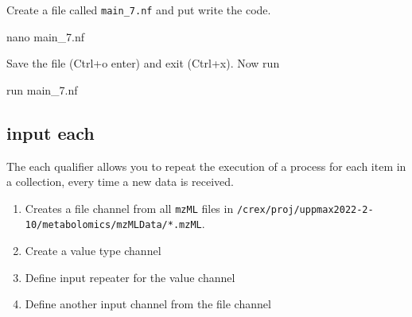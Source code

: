 \documentclass[
]{book}
\newenvironment{Shaded}{\begin{snugshade}}{\end{snugshade}}
\newcommand{\BuiltInTok}[1]{#1}
\newcommand{\CommentTok}[1]{\textcolor[rgb]{0.56,0.35,0.01}{\textit{#1}}}
\newcommand{\ErrorTok}[1]{\textcolor[rgb]{0.64,0.00,0.00}{\textbf{#1}}}
\newcommand{\ExtensionTok}[1]{#1}
\newcommand{\FunctionTok}[1]{\textcolor[rgb]{0.00,0.00,0.00}{#1}}
\newcommand{\KeywordTok}[1]{\textcolor[rgb]{0.13,0.29,0.53}{\textbf{#1}}}
\newcommand{\NormalTok}[1]{#1}
\newcommand{\StringTok}[1]{\textcolor[rgb]{0.31,0.60,0.02}{#1}}
\newcommand{\VariableTok}[1]{\textcolor[rgb]{0.00,0.00,0.00}{#1}}
\providecommand{\tightlist}{%
  \setlength{\itemsep}{0pt}\setlength{\parskip}{0pt}}
\begin{document}
Create a file called \texttt{main\_7.nf} and put write the code.

\begin{Shaded}
\begin{Highlighting}[numbers=left,,]
\FunctionTok{nano}\NormalTok{ main\_7.nf}
\end{Highlighting}
\end{Shaded}

Save the file (Ctrl+o enter) and exit (Ctrl+x). Now run

\begin{Shaded}
\begin{Highlighting}[numbers=left,,]
\ExtensionTok{run}\NormalTok{ main\_7.nf}
\end{Highlighting}
\end{Shaded}

\hypertarget{input-each}{%
\subsection{input each}\label{input-each}}

The each qualifier allows you to repeat the execution of a process for each item in a collection, every time a new data is received.

\begin{Shaded}
\end{Shaded}

\begin{enumerate}
\def\labelenumi{\arabic{enumi}.}
\tightlist
\item
  Creates a file channel from all \texttt{mzML} files in \texttt{/crex/proj/uppmax2022-2-10/metabolomics/mzMLData/*.mzML\textquotesingle{}}.\\
\item
  Create a value type channel
\item
  Define input repeater for the value channel
\item
  Define another input channel from the file channel
\end{enumerate}
\end{document}
